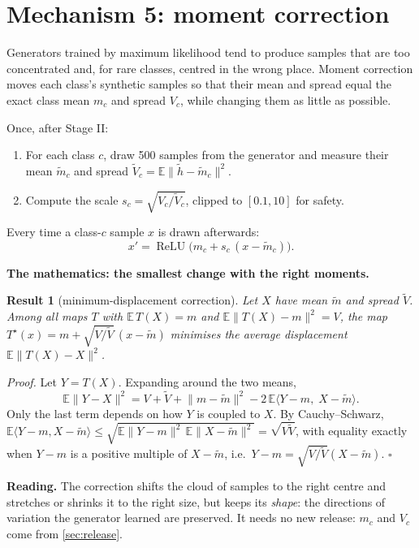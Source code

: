 \documentclass[11pt]{article}
\theoremstyle{plain}
\newtheorem{result}{Result}
\theoremstyle{definition}
\newcommand{\E}{\mathbb{E}}
\newcommand{\norm}[1]{\lVert #1\rVert}
\newcommand{\ReLU}{\operatorname{ReLU}}
\begin{document}
\section{Mechanism 5: moment correction}\label{sec:mc}

\begin{purpose}
Generators trained by maximum likelihood tend to produce samples that are too concentrated and, for rare classes,
centred in the wrong place. Moment correction moves each class's synthetic samples so that their mean and spread equal
the exact class mean $m_c$ and spread $V_c$, while changing them as little as possible.
\end{purpose}

\begin{steps}
Once, after Stage II:
\begin{enumerate}
\item For each class $c$, draw 500 samples from the generator and measure their mean $\tilde m_c$ and spread
$\tilde V_c=\E\norm{\tilde h-\tilde m_c}^2$.
\item Compute the scale $s_c=\sqrt{V_c/\tilde V_c}$, clipped to $[0.1,10]$ for safety.
\end{enumerate}
Every time a class-$c$ sample $x$ is drawn afterwards:
\[
x'=\ReLU\big(m_c+s_c\,(x-\tilde m_c)\big).
\]
\end{steps}

\textbf{The mathematics: the smallest change with the right moments.}

\begin{result}[minimum-displacement correction]\label{res:mc}
Let $X$ have mean $\tilde m$ and spread $\tilde V$. Among \emph{all} maps $T$ with $\E\,T(X)=m$ and
$\E\norm{T(X)-m}^2=V$, the map $T^\star(x)=m+\sqrt{V/\tilde V}\,(x-\tilde m)$ minimises the average displacement
$\E\norm{T(X)-X}^2$.
\end{result}
\emph{Proof.} Let $Y=T(X)$. Expanding around the two means,
\[
\E\norm{Y-X}^2=V+\tilde V+\norm{m-\tilde m}^2-2\,\E\langle Y-m,\;X-\tilde m\rangle .
\]
Only the last term depends on how $Y$ is coupled to $X$. By Cauchy--Schwarz,
$\E\langle Y-m,X-\tilde m\rangle\le\sqrt{\E\norm{Y-m}^2\,\E\norm{X-\tilde m}^2}=\sqrt{V\tilde V}$, with equality exactly
when $Y-m$ is a positive multiple of $X-\tilde m$, i.e.\ $Y-m=\sqrt{V/\tilde V}(X-\tilde m)$. $\square$

\textbf{Reading.} The correction shifts the cloud of samples to the right centre and stretches or shrinks it to the
right size, but keeps its \emph{shape}: the directions of variation the generator learned are preserved. It needs no
new release: $m_c$ and $V_c$ come from \cref{sec:release}.
\end{document}
